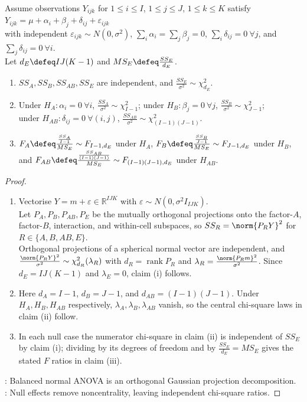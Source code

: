 \begin{theorem} \label{thm:two-way-anova-f-tests} \\
Assume observations $Y_{ijk}$ for $1\leq i\leq I$, $1\leq j\leq J$, $1\leq k\leq K$ satisfy $Y_{ijk}=\mu+\alpha_i+\beta_j+\delta_{ij}+\varepsilon_{ijk}$\\
with independent $\varepsilon_{ijk}\sim N(0,\sigma^2)$, $\sum\limits_i\alpha_i=\sum\limits_j\beta_j=0$, $\sum\limits_i\delta_{ij}=0\ \forall j$, and $\sum\limits_j\delta_{ij}=0\ \forall i$.\\
Let $d_E\defeq IJ(K-1)$ and $MS_E\defeq \frac{SS_E}{d_E}$.
\begin{enumerate}[label=(\roman*)]
\setlength{\itemsep}{0pt}
\item $SS_A,SS_B,SS_{AB},SS_E$ are independent, and $\frac{SS_E}{\sigma^2}\sim\chi^2_{d_E}$.
\item Under $H_A:\alpha_i=0\ \forall i$, $\frac{SS_A}{\sigma^2}\sim\chi^2_{I-1}$; under $H_B:\beta_j=0\ \forall j$, $\frac{SS_B}{\sigma^2}\sim\chi^2_{J-1}$;\\
under $H_{AB}:\delta_{ij}=0\ \forall(i,j)$, $\frac{SS_{AB}}{\sigma^2}\sim\chi^2_{(I-1)(J-1)}$.
\item $F_A\defeq \frac{\frac{SS_A}{I-1}}{MS_E}\sim F_{I-1,d_E}$ under $H_A$, $F_B\defeq \frac{\frac{SS_B}{J-1}}{MS_E}\sim F_{J-1,d_E}$ under $H_B$,\\
and $F_{AB}\defeq \frac{\frac{SS_{AB}}{(I-1)(J-1)}}{MS_E}\sim F_{(I-1)(J-1),d_E}$ under $H_{AB}$.
\end{enumerate}
\begin{proof}
\begin{enumerate}[label=(\roman*)]
\setlength{\itemsep}{0pt}
\item Vectorise $Y=m+\varepsilon\in\mathbb{R}^{IJK}$ with $\varepsilon\sim N(0,\sigma^2 I_{IJK})$.\\
Let $P_A,P_B,P_{AB},P_E$ be the mutually orthogonal projections onto the factor-$A$, factor-$B$, interaction, and within-cell subspaces, so $SS_R=\norm{P_RY}^2$ for $R\in\{A,B,AB,E\}$.\\
Orthogonal projections of a spherical normal vector are independent, and $\frac{\norm{P_RY}^2}{\sigma^2}\sim\chi^2_{d_R}(\lambda_R)$ with $d_R=\operatorname{rank}P_R$ and $\lambda_R=\frac{\norm{P_Rm}^2}{\sigma^2}$. Since $d_E=IJ(K-1)$ and $\lambda_E=0$, claim (i) follows.
\item Here $d_A=I-1$, $d_B=J-1$, and $d_{AB}=(I-1)(J-1)$. Under $H_A,H_B,H_{AB}$ respectively, $\lambda_A,\lambda_B,\lambda_{AB}$ vanish, so the central chi-square laws in claim (ii) follow.
\item In each null case the numerator chi-square in claim (ii) is independent of $SS_E$ by claim (i); dividing by its degrees of freedom and by $\frac{SS_E}{d_E}=MS_E$ gives the stated $F$ ratios in claim (iii).
\end{enumerate}
: Balanced normal ANOVA is an orthogonal Gaussian projection decomposition.\\
: Null effects remove noncentrality, leaving independent chi-square ratios.
\end{proof}
\end{theorem}

